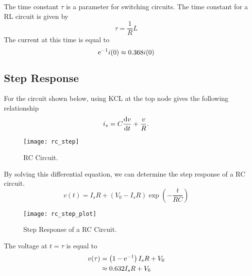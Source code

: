\documentclass{article}
\begin{document}
\begin{definition}
    The time constant $\tau$ is a parameter for switching circuits. The time constant for a RL circuit is given by
    \begin{equation*}
        \tau = \frac{1}{R}L
    \end{equation*}
    The current at this time is equal to
    \begin{equation*}
        \mathrm{e}^{-1}i(0) \approx 0.368i(0)
    \end{equation*} 
\end{definition}
\subsection{Step Response}
\begin{definition}
    For the circuit shown below, using KCL at the top node gives the following relationship
    \begin{equation*}
        i_s = C\dv{v}{t} + \frac{v}{R}.
    \end{equation*}
    \begin{figure}[H]
        \centering
        \texttt{[image: rc\_step]}
        \caption{RC Circuit.}
    \end{figure}
    By solving this differential equation, we can determine the step response of a 
    RC circuit.
    \begin{equation*}
        v(t) = I_sR + \left(V_0 - I_sR\right) \exp{\left( -\frac{t}{RC} \right)}
    \end{equation*}
    \begin{figure}[H]
        \centering
        \texttt{[image: rc\_step\_plot]}
        \caption{Step Response of a RC Circuit.}
    \end{figure}
    The voltage at $t=\tau$ is equal to
    \begin{align*}
        v(\tau) &= \left(1 - \mathrm{e}^{-1}\right)I_sR + V_0 \\
        &\approx 0.632I_sR + V_0
    \end{align*} 
\end{definition}
\end{document}
